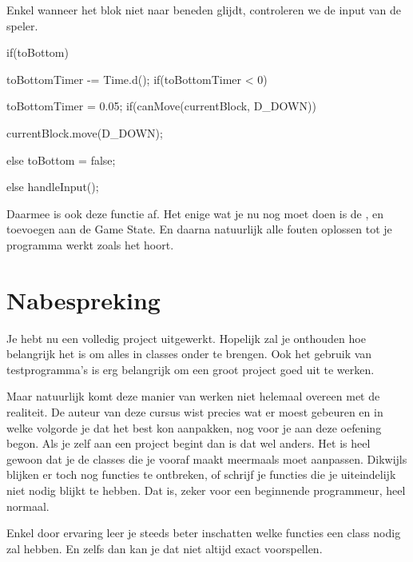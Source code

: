 Enkel wanneer het blok niet naar beneden glijdt, controleren we de input van de speler.

\begin{code}
if(toBottom)
{
	 toBottomTimer -= Time.d();
	 if(toBottomTimer < 0)
	 {
			toBottomTimer = 0.05;
			if(canMove(currentBlock, D_DOWN))
			{
				 currentBlock.move(D_DOWN);

			} else
			{
				 toBottom = false;
			}
	 }
} else
{
	 handleInput();
}
\end{code}

Daarmee is ook deze functie af. Het enige wat je nu nog moet doen is de ,  en  toevoegen aan de Game State. En daarna natuurlijk alle fouten oplossen tot je programma werkt zoals het hoort.

\section{Nabespreking}
Je hebt nu een volledig project uitgewerkt. Hopelijk zal je onthouden hoe belangrijk het is om alles in classes onder te brengen. Ook het gebruik van testprogramma's is erg belangrijk om een groot project goed uit te werken.

Maar natuurlijk komt deze manier van werken niet helemaal overeen met de realiteit. De auteur van deze cursus wist precies wat er moest gebeuren en in welke volgorde je dat het best kon aanpakken, nog voor je aan deze oefening begon. Als je zelf aan een project begint dan is dat wel anders. Het is heel gewoon dat je de classes die je vooraf maakt meermaals moet aanpassen. Dikwijls blijken er toch nog functies te ontbreken, of schrijf je functies die je uiteindelijk niet nodig blijkt te hebben. Dat is, zeker voor een beginnende programmeur, heel normaal.

Enkel door ervaring leer je steeds beter inschatten welke functies een class nodig zal hebben. En zelfs dan kan je dat niet altijd exact voorspellen.